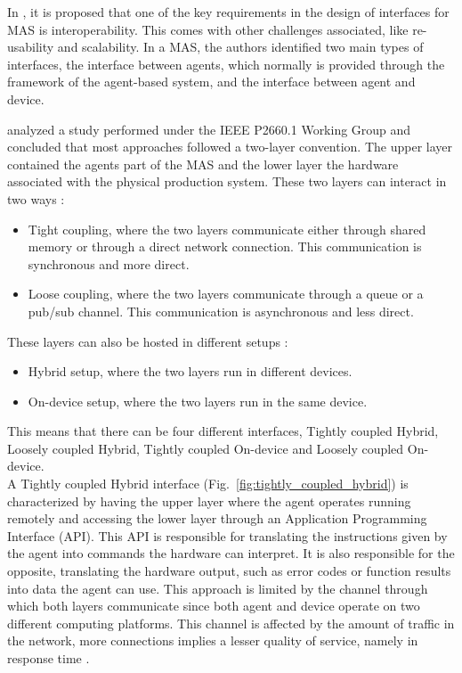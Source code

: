 In \cite{Karnouskos2019}, it is proposed that one of the key requirements in the design of interfaces for MAS is interoperability. This comes with other challenges associated, like re-usability and scalability. In a MAS, the authors identified two main types of interfaces, the interface between agents, which normally is provided through the framework of the agent-based system, and the interface between agent and device. 


\citeauthor{8591641} \cite{8591641} analyzed a study performed under the IEEE P2660.1 Working Group \cite{9340089} and concluded that most approaches followed a two-layer convention. The upper layer contained the agents part of the MAS and the lower layer the hardware associated with the physical production system. These two layers can interact in two ways \cite{8591641}:
\begin{itemize}
	\item Tight coupling, where the two layers communicate either through shared memory or through a direct network connection. This communication is synchronous and more direct.
	\item Loose coupling, where the two layers communicate through a queue or a pub/sub channel. This communication is asynchronous and less direct.
\end{itemize}

These layers can also be hosted in different setups \cite{8591641}:
\begin{itemize}
	\item Hybrid setup, where the two layers run in different devices.
	\item On-device setup, where the two layers run in the same device. 
\end{itemize}

This means that there can be four different interfaces, Tightly coupled Hybrid, Loosely coupled Hybrid, Tightly coupled On-device and Loosely coupled On-device.\\

A Tightly coupled Hybrid interface (Fig.~\ref{fig:tightly_coupled_hybrid}) is characterized by having the upper layer where the agent operates running remotely and accessing the lower layer through an Application Programming Interface (API). This API is responsible for translating the instructions given by the agent into commands the hardware can interpret. It is also responsible for the opposite, translating the hardware output, such as error codes or function results into data the agent can use. This approach is limited by the channel through which both layers communicate since both agent and device operate on two different computing platforms. This channel is affected by the amount of traffic in the network, more connections implies a lesser quality of service, namely in response time \cite{8591641}.\\

